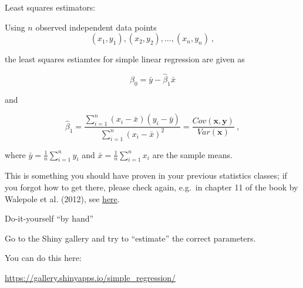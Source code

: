 \documentclass[10pt,ignorenonframetext,]{beamer}
\begin{document}
\begin{frame}

\begin{block}{Least squares estimators:}

\vspace{2mm}

Using \(n\) observed independent data points
\[(x_1,y_1), (x_2,y_2), \ldots, (x_n,y_n)\ ,\]

the least squares estiamtes for simple linear regression are given as

\begin{equation}\label{eq:beta0}
\hat{\beta}_0 = \bar{y}-\hat{\beta}_1 \bar{x}
\end{equation}

and

\begin{equation}\label{eq:beta1}
\hat{\beta}_1 = \frac{\sum_{i=1}^n(x_i-\bar{x})(y_i-\bar{y})}{\sum_{i=1}^n(x_i-\bar{x})^2} = \frac{Cov(\boldsymbol{x},\boldsymbol{y})}{Var(\boldsymbol{x})}\ ,
\end{equation}

\vspace{2mm} where \(\bar{y} = \frac{1}{n} \sum_{i=1}^n y_i\) and
\(\bar{x} = \frac{1}{n}\sum_{i=1}^n x_i\) are the sample means.

\vspace{6mm} \scriptsize
This is something you should have proven in your previous statistics
classes; if you forgot how to get there, please check again, e.g.~in
chapter 11 of the book by Walepole et al. (2012), see
\href{https://github.com/stefaniemuff/statlearning/blob/master/literature/Walepole_book.pdf}{here}.

\end{block}

\end{frame}

\begin{frame}

\begin{block}{Do-it-yourself ``by hand''}

\vspace{6mm}

Go to the Shiny gallery and try to ``estimate'' the correct parameters.
\vspace{2mm}

You can do this here: \vspace{2mm}

\url{https://gallery.shinyapps.io/simple_regression/}

\end{block}

\end{frame}
\end{document}
